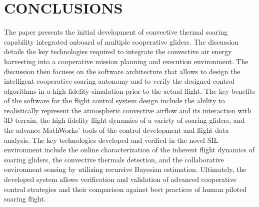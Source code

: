 \documentclass[letterpaper, 10 pt, conference]{ieeeconf}  %
\begin{document}
\section*{CONCLUSIONS}
The paper presents the initial development of convective thermal soaring capability integrated onboard of multiple cooperative gliders. The discussion details the key technologies required to integrate
the convective air energy harvesting into a cooperative mission planning and execution environment. The discussion then focuses on the software architecture that allows to design the intelligent cooperative soaring autonomy and to verify the designed control algorithms in a high-fidelity simulation prior to the actual flight. The key benefits of the software for the flight control system design include the ability to realistically represent the atmospheric convective airflow and its interaction with 3D terrain, the high-fidelity flight dynamics of a variety of soaring gliders, and the advance MathWorks' tools of the control development and flight data analysis. The key technologies developed and verified in the novel SIL environment include the online characterization of the inherent flight dynamics of soaring gliders, the convective thermals detection, and the collaborative environment sensing by utilizing recursive Bayesian estimation. Ultimately, the developed system allows verification and validation of advanced cooperative control strategies and their comparison against best practices of human piloted soaring flight.




\end{document}
